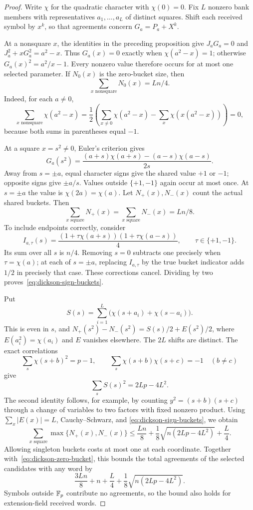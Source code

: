 \begin{proof}
Write $\chi$ for the quadratic character with $\chi(0)=0$.
Fix $L$ nonzero bank members with representatives $a_1,\ldots,a_L$
of distinct squares.  Shift each received symbol by $x^k$, so that
agreements concern $G_a=P_a+X^k$.

At a nonsquare $x$, the identities in the preceding proposition give
$J_aG_a=0$ and $J_a^2+xG_a^2=a^2-x$.
Thus $G_a(x)=0$ exactly when $\chi(a^2-x)=1$; otherwise
$G_a(x)^2=a^2/x-1$.  Every nonzero value therefore occurs for at most
one selected parameter.  If $N_0(x)$ is the zero-bucket size, then
\begin{equation}\label{eq:dickson-zero-bucket}
 \sum_{x\text{ nonsquare}}N_0(x)=Ln/4.
\end{equation}
Indeed, for each $a\ne0$,
\[
 \sum_{x\text{ nonsquare}}\chi(a^2-x)
 =\frac12\left(\sum_{x\ne0}\chi(a^2-x)
                   -\sum_x\chi(x(a^2-x))\right)=0,
\]
because both sums in parentheses equal $-1$.

At a square $x=s^2\ne0$, Euler's criterion gives
\[
 G_a(s^2)=
 \frac{(a+s)\chi(a+s)-(a-s)\chi(a-s)}{2s}.
\]
Away from $s=\pm a$, equal character signs give the shared value
$+1$ or $-1$; opposite signs give $\pm a/s$.
Values outside $\{+1,-1\}$ again occur at most once.
At $s=\pm a$ the value is $\chi(2a)=\chi(a)$.
Let $N_+(x),N_-(x)$ count the actual shared buckets.  Then
\begin{equation}\label{eq:dickson-sign-buckets}
 \sum_{x\text{ square}}N_+(x)
 =\sum_{x\text{ square}}N_-(x)=Ln/8.
\end{equation}
To include endpoints correctly, consider
\[
 I_{a,\tau}(s)=
 \frac{(1+\tau\chi(a+s))(1+\tau\chi(a-s))}{4},
 \qquad \tau\in\{+1,-1\}.
\]
Its sum over all $s$ is $n/4$.
Removing $s=0$ subtracts one precisely when $\tau=\chi(a)$;
at each of $s=\pm a$, replacing $I_{a,\tau}$ by the true bucket
indicator adds $1/2$ in precisely that case.  These corrections cancel.
Dividing by two proves~\eqref{eq:dickson-sign-buckets}.

Put
\[
 S(s)=\sum_{i=1}^L\bigl(\chi(s+a_i)+\chi(s-a_i)\bigr).
\]
This is even in $s$, and
$N_+(s^2)-N_-(s^2)=S(s)/2+E(s^2)/2$,
where $E(a_i^2)=\chi(a_i)$ and $E$ vanishes elsewhere.
The $2L$ shifts are distinct.  The exact correlations
\[
 \sum_s\chi(s+b)^2=p-1,\qquad
 \sum_s\chi(s+b)\chi(s+c)=-1\quad(b\ne c)
\]
give
\[
 \sum_s S(s)^2=2Lp-4L^2.
\]
The second identity follows, for example, by counting
$y^2=(s+b)(s+c)$ through a change of variables to two factors
with fixed nonzero product.
Using $\sum_x|E(x)|=L$, Cauchy--Schwarz, and
\eqref{eq:dickson-sign-buckets}, we obtain
\[
 \sum_{x\text{ square}}\max\{N_+(x),N_-(x)\}
 \le\frac{Ln}{8}+\frac18\sqrt{n(2Lp-4L^2)}+\frac L4.
\]
Allowing singleton buckets costs at most one at each coordinate.
Together with~\eqref{eq:dickson-zero-bucket}, this bounds the total
agreements of the selected candidates with any word by
\begin{equation}\label{eq:dickson-total-agreements}
 \frac{3Ln}{8}+n+\frac L4+\frac18\sqrt{n(2Lp-4L^2)}.
\end{equation}
Symbols outside $\mathbb F_p$ contribute no agreements, so the bound also
holds for extension-field received words.


\end{proof}
